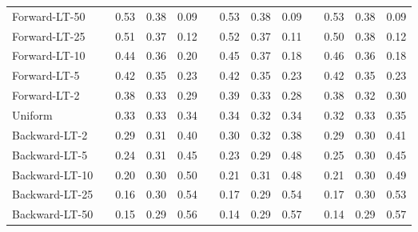\documentclass{article}
\begin{document}
\begin{table*}[h]
\begin{center}
\begin{threeparttable}
{\begin{tabular}{lcccccccccccc}
        \midrule
        Forward-LT-50   &&  0.53 & 0.38 & 0.09 && 0.53 & 0.38 & 0.09 &&  0.53 &0.38 & 0.09\\ 
        Forward-LT-25   && 0.51 & 0.37 &0.12 &&  0.52 & 0.37& 0.11 &&  0.50 & 0.38 & 0.12 \\
         Forward-LT-10  && 0.44 & 0.36 & 0.20 &&  0.45 & 0.37 & 0.18 && 0.46 & 0.36 & 0.18 \\
         Forward-LT-5   &&  0.42 & 0.35 & 0.23 && 0.42 & 0.35 & 0.23 && 0.42 & 0.35 & 0.23 \\
        Forward-LT-2   &&  0.38 & 0.33 &0.29 &&   0.39 & 0.33 & 0.28 && 0.38 & 0.32 & 0.30 \\
         Uniform     && 0.33 & 0.33 & 0.34 &&   0.34 & 0.32 & 0.34&&  0.32 & 0.33 &0.35\\
         Backward-LT-2  && 0.29 & 0.31 & 0.40 &&   0.30 & 0.32 &0.38 &&  0.29 & 0.30& 0.41 \\
         Backward-LT-5  &&  0.24 & 0.31 & 0.45&&   0.23 & 0.29 & 0.48 && 0.25 & 0.30 & 0.45 \\
         
          Backward-LT-10  && 0.20 & 0.30 & 0.50 && 0.21 & 0.31 & 0.48 && 0.21 & 0.30 & 0.49\\
          Backward-LT-25  && 0.16 & 0.30 & 0.54 && 0.17 & 0.29 & 0.54 &&   0.17 & 0.30 & 0.53\\
         Backward-LT-50    && 0.15 & 0.29 & 0.56 &&  0.14 & 0.29 &0.57 &&  0.14 & 0.29 & 0.57\\     
        \bottomrule

	\end{tabular}} 
	 \end{threeparttable} 
	 \end{center}  
\end{table*} 
\end{document}
